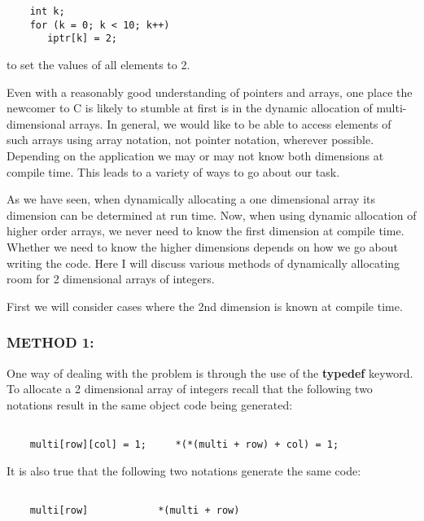 \begin{verbatim}
    int k;
    for (k = 0; k < 10; k++)
       iptr[k] = 2;
\end{verbatim}

to set the values of all elements to 2.

Even with a reasonably good understanding of pointers and arrays, one
place the newcomer to C is likely to stumble at first is in the dynamic
allocation of multi-dimensional arrays. In general, we would like to be
able to access elements of such arrays using array notation, not pointer
notation, wherever possible. Depending on the application we may or may
not know both dimensions at compile time. This leads to a variety of
ways to go about our task.

As we have seen, when dynamically allocating a one dimensional array its
dimension can be determined at run time. Now, when using dynamic
allocation of higher order arrays, we never need to know the first
dimension at compile time. Whether we need to know the higher dimensions
depends on how we go about writing the code. Here I will discuss various
methods of dynamically allocating room for 2 dimensional arrays of
integers.

First we will consider cases where the 2nd dimension is known at compile
time.

\hypertarget{method-1}{%
\subsubsection{METHOD 1:}\label{method-1}}

One way of dealing with the problem is through the use of the
\textbf{typedef} keyword. To allocate a 2 dimensional array of integers
recall that the following two notations result in the same object code
being generated:

\begin{verbatim}

    multi[row][col] = 1;     *(*(multi + row) + col) = 1;
\end{verbatim}

It is also true that the following two notations generate the same code:

\begin{verbatim}

    multi[row]            *(multi + row)
\end{verbatim}

